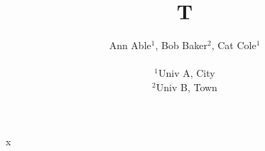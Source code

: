 \documentclass{article}
\begin{document}
\title{T}
\author{{\parbox[c]{\textwidth}{\centering Ann Able$^{1}$, Bob Baker$^{2}$, Cat Cole$^{1}$}}\\
$^{1}$Univ A, City\\ $^{2}$Univ B, Town}
\maketitle
x
\end{document}
